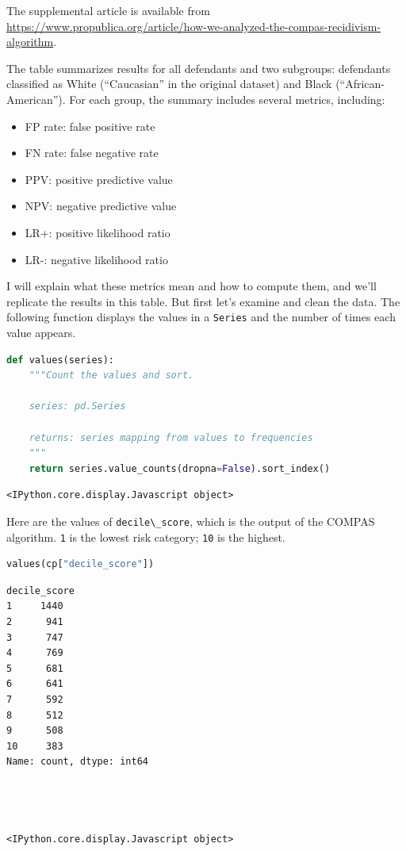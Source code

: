 The supplemental article is available from
\url{https://www.propublica.org/article/how-we-analyzed-the-compas-recidivism-algorithm}.

The table summarizes results for all defendants and two subgroups:
defendants classified as White (``Caucasian'' in the original dataset)
and Black (``African-American''). For each group, the summary includes
several metrics, including:

\begin{itemize}

\item
  FP rate: false positive rate
\item
  FN rate: false negative rate
\item
  PPV: positive predictive value
\item
  NPV: negative predictive value
\item
  LR+: positive likelihood ratio
\item
  LR-: negative likelihood ratio
\end{itemize}

I will explain what these metrics mean and how to compute them, and
we'll replicate the results in this table. But first let's examine and
clean the data. The following function displays the values in a
\passthrough{\lstinline!Series!} and the number of times each value
appears.

\begin{lstlisting}[language=Python,style=source]
def values(series):
    """Count the values and sort.

    series: pd.Series

    returns: series mapping from values to frequencies
    """
    return series.value_counts(dropna=False).sort_index()
\end{lstlisting}

\begin{lstlisting}[style=output]
<IPython.core.display.Javascript object>
\end{lstlisting}

Here are the values of \passthrough{\lstinline!decile\_score!}, which is
the output of the COMPAS algorithm. \passthrough{\lstinline!1!} is the
lowest risk category; \passthrough{\lstinline!10!} is the highest.

\begin{lstlisting}[language=Python,style=source]
values(cp["decile_score"])
\end{lstlisting}

\begin{lstlisting}[style=output]
decile_score
1     1440
2      941
3      747
4      769
5      681
6      641
7      592
8      512
9      508
10     383
Name: count, dtype: int64




<IPython.core.display.Javascript object>
\end{lstlisting}

